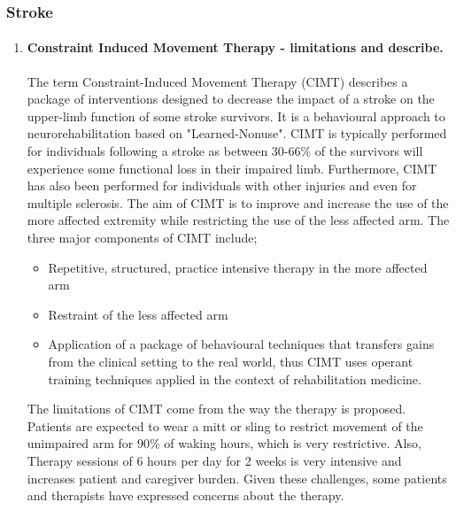 \documentclass[12pt,article,oneside,a4paper]{memoir}
\begin{document}
\subsubsection{Stroke}
\begin{enumerate}
\item \paragraph{Constraint Induced Movement Therapy - limitations and
describe.}

The term Constraint-Induced Movement Therapy (CIMT) describes a package of
interventions designed to decrease the impact of a stroke on the upper-limb
function of some stroke survivors. It is a behavioural approach to
neurorehabilitation based on "Learned-Nonuse".
CIMT is typically performed for individuals following a stroke as between
30-66\% of the survivors will experience some functional loss in their impaired
limb. Furthermore, CIMT has also been performed for individuals with other
injuries and even for multiple sclerosis. The aim of CIMT is to improve and
increase the use of the more affected extremity while restricting the use of
the less affected arm.
The three major components of CIMT include;
\begin{itemize}
\item Repetitive, structured, practice intensive therapy in the more affected
arm
\item Restraint of the less affected arm
\item Application of a package of behavioural techniques that transfers gains
from the clinical setting to the real world, thus CIMT uses operant training
techniques applied in the context of rehabilitation medicine.
\end{itemize}

The limitations of CIMT come from the way the therapy is proposed. Patients
are expected to wear a mitt or sling to restrict movement of the unimpaired arm
for 90\% of waking hours, which is very restrictive. Also, Therapy sessions of
6 hours per day for 2 weeks is very intensive and increases patient and
caregiver burden. Given these challenges, some patients and therapists have
expressed concerns about the therapy.

\end{enumerate}
\end{document}
